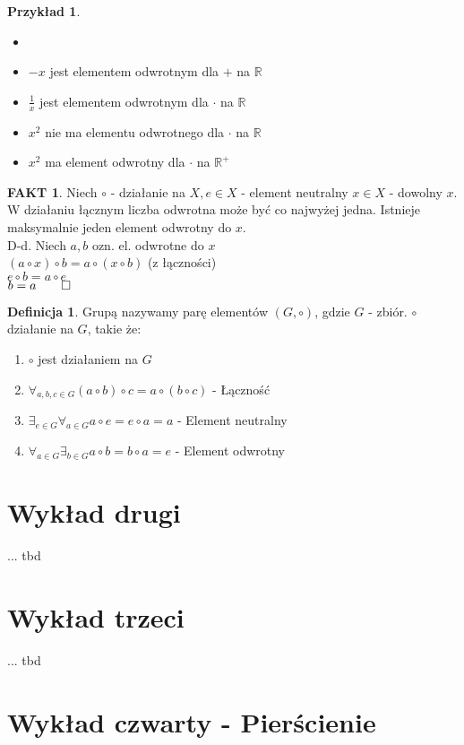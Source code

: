 \documentclass{article}
\theoremstyle{definition}
\newtheorem{de}{Definicja}[subsection]
\theoremstyle{definition}
\theoremstyle{definition}
\newtheorem{pk}{Przykład}[subsection]
\theoremstyle{definition}
\newtheorem*{fakt}{FAKT}
\begin{document}
\begin{pk}
\begin{itemize}
    \item[]
    \item $-x$ jest elementem odwrotnym dla $+$ na $\mathbb{R}$
    \item $\frac{1}{x}$ jest elementem odwrotnym dla $\cdot$ na $\mathbb{R}$
    \item $x^2$ nie ma elementu odwrotnego dla $\cdot$ na $\mathbb{R}$
    \item $x^2$ ma element odwrotny dla $\cdot$ na $\mathbb{R}^+$
\end{itemize}
\end{pk}

\begin{fakt}
Niech $\circ$ - działanie na $X, e\in X$ - element neutralny $x\in X$ - dowolny $x$. W działaniu łącznym liczba odwrotna może być co najwyżej jedna.
Istnieje maksymalnie jeden element odwrotny do $x$.\\
D-d. Niech $a,b$ ozn. el. odwrotne do $x$\\
$(a\circ x)\circ b = a\circ (x\circ b)$ (z łączności)\\
$e\circ b=a\circ e$\\
$b=a\qed$
\end{fakt}

\begin{de}
Grupą nazywamy parę elementów $(G,\circ)$, gdzie $G$ - zbiór. $\circ$ działanie na $G$, takie że:
\begin{enumerate}
\item $\circ$ jest działaniem na $G$
\item $\forall_{a,b,c\in G} (a\circ b)\circ c = a\circ (b\circ c)$ - Łączność
\item $\exists_{e\in G} \forall_{a\in G} a\circ e = e\circ a = a$ - Element neutralny
\item $\forall_{a\in G} \exists_{b\in G} a\circ b = b\circ a = e$ - Element odwrotny
\end{enumerate}
\end{de}

\section{Wykład drugi}
... tbd
\section{Wykład trzeci}
... tbd
\section{Wykład czwarty - Pierścienie}
\end{document}
